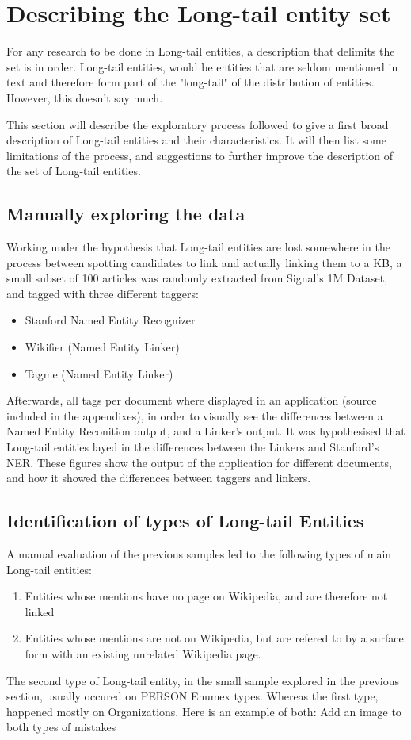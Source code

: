 \section{Describing the Long-tail entity set}
For any research to be done in Long-tail entities, a description that delimits the set is in order.
Long-tail entities, would be entities that are seldom mentioned in text and therefore form part of the "long-tail" of the distribution of entities.
However, this doesn't say much. 

This section will describe the exploratory process followed to give a first broad description of Long-tail entities and their characteristics.
It will then list some limitations of the process, and suggestions to further improve the description of the set of Long-tail entities.

\subsection{Manually exploring the data}
Working under the hypothesis that Long-tail entities are lost somewhere in the process between spotting candidates to link and actually linking them to a KB,
a small subset of 100 articles was randomly extracted from Signal's 1M Dataset, and tagged with three different taggers:
\begin{itemize}
\item Stanford Named Entity Recognizer\cite{rw_elo_finkel2005}
\item Wikifier (Named Entity Linker)\cite{wikifier_used}
\item Tagme (Named Entity Linker)\cite{tagme}
\end{itemize}
Afterwards, all tags per document where displayed in an application (source included in the appendixes), in order to visually see the differences between a Named Entity Reconition output, and a Linker's output.
It was hypothesised that Long-tail entities layed in the differences between the Linkers and Stanford's NER.
These figures show the output of the application for different documents, and how it showed the differences between taggers and linkers.


\subsection{Identification of types of Long-tail Entities}
A manual evaluation of the previous samples led to the following types of main Long-tail entities:
\begin{enumerate}
\item Entities whose mentions have no page on Wikipedia, and are therefore not linked
\item Entities whose mentions are not on Wikipedia, but are refered to by a surface form with an existing unrelated Wikipedia page.
\end{enumerate}
The second type of Long-tail entity, in the small sample explored in the previous section, usually occured on PERSON Enumex types.
Whereas the first type, happened mostly on Organizations.
Here is an example of both:
\todo Add an image to both types of mistakes

